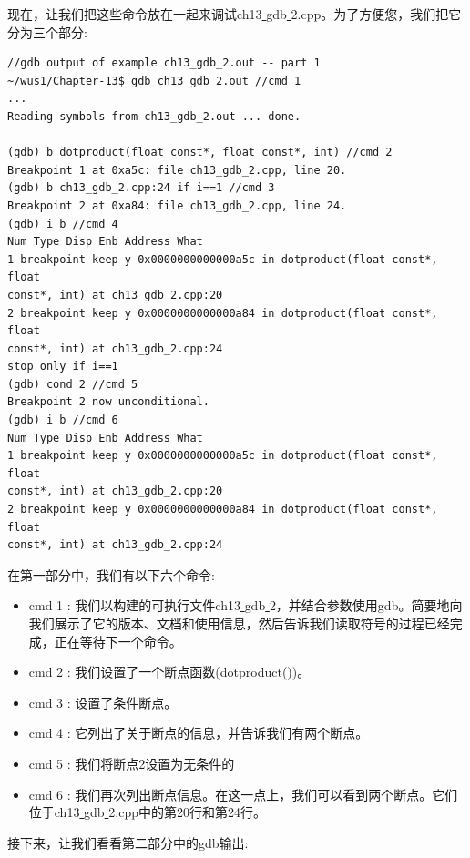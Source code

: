 现在，让我们把这些命令放在一起来调试ch13\underline{ }gdb\underline{ }2.cpp。为了方便您，我们把它分为三个部分: \par
\begin{lstlisting}[caption={}]
//gdb output of example ch13_gdb_2.out -- part 1
~/wus1/Chapter-13$ gdb ch13_gdb_2.out //cmd 1
...
Reading symbols from ch13_gdb_2.out ... done.

(gdb) b dotproduct(float const*, float const*, int) //cmd 2
Breakpoint 1 at 0xa5c: file ch13_gdb_2.cpp, line 20.
(gdb) b ch13_gdb_2.cpp:24 if i==1 //cmd 3
Breakpoint 2 at 0xa84: file ch13_gdb_2.cpp, line 24.
(gdb) i b //cmd 4
Num Type Disp Enb Address What
1 breakpoint keep y 0x0000000000000a5c in dotproduct(float const*, float
const*, int) at ch13_gdb_2.cpp:20
2 breakpoint keep y 0x0000000000000a84 in dotproduct(float const*, float
const*, int) at ch13_gdb_2.cpp:24
stop only if i==1
(gdb) cond 2 //cmd 5
Breakpoint 2 now unconditional.
(gdb) i b //cmd 6
Num Type Disp Enb Address What
1 breakpoint keep y 0x0000000000000a5c in dotproduct(float const*, float
const*, int) at ch13_gdb_2.cpp:20
2 breakpoint keep y 0x0000000000000a84 in dotproduct(float const*, float
const*, int) at ch13_gdb_2.cpp:24
\end{lstlisting}

在第一部分中，我们有以下六个命令: \par

\begin{itemize}
	\item cmd 1 : 我们以构建的可执行文件ch13\underline{ }gdb\underline{ }2，并结合参数使用gdb。简要地向我们展示了它的版本、文档和使用信息，然后告诉我们读取符号的过程已经完成，正在等待下一个命令。
	\item cmd 2 : 我们设置了一个断点函数(dotproduct())。
	\item cmd 3 : 设置了条件断点。
	\item cmd 4 : 它列出了关于断点的信息，并告诉我们有两个断点。
	\item cmd 5 : 我们将断点2设置为无条件的
	\item cmd 6 : 我们再次列出断点信息。在这一点上，我们可以看到两个断点。它们位于ch13\underline{ }gdb\underline{ }2.cpp中的第20行和第24行。
\end{itemize}

接下来，让我们看看第二部分中的gdb输出: \par

